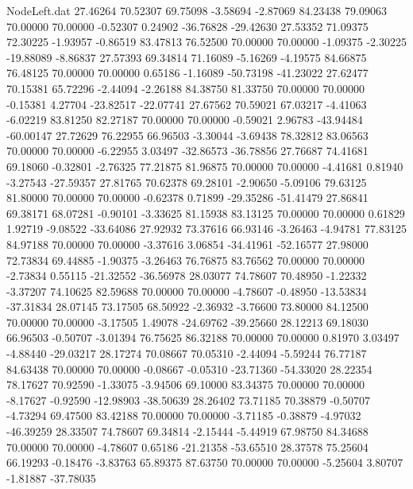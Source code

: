 \begin{filecontents}{NodeLeft.dat}
  27.46264   70.52307   69.75098    -3.58694   -2.87069   84.23438   79.09063   70.00000   70.00000   -0.52307    0.24902  -36.76828  -29.42630
  27.53352   71.09375   72.30225    -1.93957   -0.86519   83.47813   76.52500   70.00000   70.00000   -1.09375   -2.30225  -19.88089   -8.86837
  27.57393   69.34814   71.16089    -5.16269   -4.19575   84.66875   76.48125   70.00000   70.00000    0.65186   -1.16089  -50.73198  -41.23022
  27.62477   70.15381   65.72296    -2.44094   -2.26188   84.38750   81.33750   70.00000   70.00000   -0.15381    4.27704  -23.82517  -22.07741
  27.67562   70.59021   67.03217    -4.41063   -6.02219   83.81250   82.27187   70.00000   70.00000   -0.59021    2.96783  -43.94484  -60.00147
  27.72629   76.22955   66.96503    -3.30044   -3.69438   78.32812   83.06563   70.00000   70.00000   -6.22955    3.03497  -32.86573  -36.78856
  27.76687   74.41681   69.18060    -0.32801   -2.76325   77.21875   81.96875   70.00000   70.00000   -4.41681    0.81940   -3.27543  -27.59357
  27.81765   70.62378   69.28101    -2.90650   -5.09106   79.63125   81.80000   70.00000   70.00000   -0.62378    0.71899  -29.35286  -51.41479
  27.86841   69.38171   68.07281    -0.90101   -3.33625   81.15938   83.13125   70.00000   70.00000    0.61829    1.92719   -9.08522  -33.64086
  27.92932   73.37616   66.93146    -3.26463   -4.94781   77.83125   84.97188   70.00000   70.00000   -3.37616    3.06854  -34.41961  -52.16577
  27.98000   72.73834   69.44885    -1.90375   -3.26463   76.76875   83.76562   70.00000   70.00000   -2.73834    0.55115  -21.32552  -36.56978
  28.03077   74.78607   70.48950    -1.22332   -3.37207   74.10625   82.59688   70.00000   70.00000   -4.78607   -0.48950  -13.53834  -37.31834
  28.07145   73.17505   68.50922    -2.36932   -3.76600   73.80000   84.12500   70.00000   70.00000   -3.17505    1.49078  -24.69762  -39.25660
  28.12213   69.18030   66.96503    -0.50707   -3.01394   76.75625   86.32188   70.00000   70.00000    0.81970    3.03497   -4.88440  -29.03217
  28.17274   70.08667   70.05310    -2.44094   -5.59244   76.77187   84.63438   70.00000   70.00000   -0.08667   -0.05310  -23.71360  -54.33020
  28.22354   78.17627   70.92590    -1.33075   -3.94506   69.10000   83.34375   70.00000   70.00000   -8.17627   -0.92590  -12.98903  -38.50639
  28.26402   73.71185   70.38879    -0.50707   -4.73294   69.47500   83.42188   70.00000   70.00000   -3.71185   -0.38879   -4.97032  -46.39259
  28.33507   74.78607   69.34814    -2.15444   -5.44919   67.98750   84.34688   70.00000   70.00000   -4.78607    0.65186  -21.21358  -53.65510
  28.37578   75.25604   66.19293    -0.18476   -3.83763   65.89375   87.63750   70.00000   70.00000   -5.25604    3.80707   -1.81887  -37.78035

\end{filecontents}
